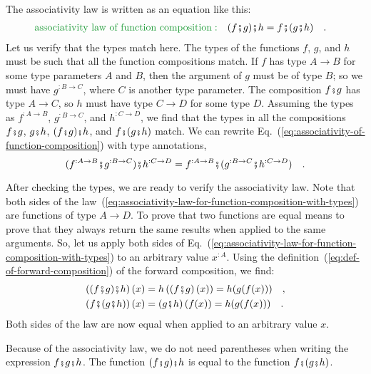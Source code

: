 The associativity law is written as an equation like this:
\begin{align}
{\color{greenunder}\text{associativity law of function composition}:}\quad & (f\bef g)\bef h=f\bef(g\bef h)\quad.\label{eq:associativity-of-function-composition}
\end{align}
Let us verify that the types match here. The types of the functions
$f$, $g$, and $h$ must be such that all the function compositions
match. If $f$ has type $A\rightarrow B$ for some type parameters
$A$ and $B$, then the argument of $g$ must be of type $B$; so
we must have $g^{:B\rightarrow C}$, where $C$ is another type parameter.
The composition $f\bef g$ has type $A\rightarrow C$, so $h$ must
have type $C\rightarrow D$ for some type $D$. Assuming the types
as $f^{:A\rightarrow B}$, $g^{:B\rightarrow C}$, and $h^{:C\rightarrow D}$,
we find that the types in all the compositions $f\bef g$, $g\bef h$,
$(f\bef g)\bef h$, and $f\bef(g\bef h)$ match. We can rewrite Eq.~(\ref{eq:associativity-of-function-composition})
with type annotations, 
\begin{equation}
(f^{:A\rightarrow B}\bef g^{:B\rightarrow C})\bef h^{:C\rightarrow D}=f^{:A\rightarrow B}\bef(g^{:B\rightarrow C}\bef h^{:C\rightarrow D})\quad.\label{eq:associativity-law-for-function-composition-with-types}
\end{equation}

After checking the types, we are ready to verify the associativity
law. Note that both sides of the law~(\ref{eq:associativity-law-for-function-composition-with-types})
are functions of type $A\rightarrow D$. To prove that two functions
are equal means to prove that they always return the same results
when applied to the same arguments. So, let us apply both sides of
Eq.~(\ref{eq:associativity-law-for-function-composition-with-types})
to an arbitrary value $x^{:A}$. Using the definition~(\ref{eq:def-of-forward-composition})
of the forward composition, we find:
\begin{align*}
\left((f\bef g)\bef h\right)(x) & =h\left(\left(f\bef g\right)(x)\right)=h(g(f(x)))\quad,\\
\left(f\bef(g\bef h)\right)(x) & =\left(g\bef h\right)(f(x))=h(g(f(x)))\quad.
\end{align*}
Both sides of the law are now equal when applied to an arbitrary value
$x$.

Because of the associativity law, we do not need parentheses when
writing the expression $f\bef g\bef h$. The function $(f\bef g)\bef h$
is equal to the function $f\bef(g\bef h)$.

